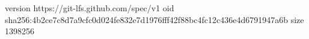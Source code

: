 version https://git-lfs.github.com/spec/v1
oid sha256:4b2ce7c8d7a9cfc0d024fe832e7d1976fff42f88bc4fc12c436e4d6791947a6b
size 1398256
